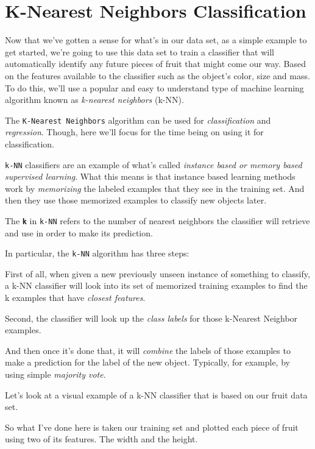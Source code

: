 \section{K-Nearest Neighbors Classification}
\begin{multicols}{2}

Now that we've gotten a sense for what's in our data set, as a simple example to get started, we're going to use this data set to train a classifier that will automatically identify any future pieces of fruit that might come our way. Based on the features available to the classifier such as the object's color, size and mass. To do this, we'll use a popular and easy to understand type of machine learning algorithm known as \emph{k-nearest neighbors} (k-NN). 

The \texttt{K-Nearest Neighbors} algorithm can be used for \emph{classification} and \emph{regression}. Though, here we'll focus for the time being on using it for classification. 

\texttt{k-NN} classifiers are an example of what's called \emph{instance based or memory based supervised learning}. What this means is that instance based learning methods work by \emph{memorizing} the labeled examples that they see in the training set. And then they use those memorized examples to classify new objects later. 

The \textbf{\texttt{k}} in \texttt{k-NN} refers to the number of nearest neighbors the classifier will retrieve and use in order to make its prediction. 

In particular, the \texttt{k-NN}  algorithm has three steps:

First of all, when given a new previously unseen instance of something to classify, a k-NN classifier will look into its set of memorized training examples to find the k examples that have \emph{closest features}. 

Second, the classifier will look up the \emph{class labels} for those k-Nearest Neighbor examples. 

And then once it's done that, it will \emph{combine} the labels of those examples to make a prediction for the label of the new object. Typically, for example, by using simple \emph{majority vote}. 

Let's look at a visual example of a k-NN classifier that is based on our fruit data set. 

So what I've done here is taken our training set and plotted each piece of fruit using two of its features. The width and the height. 


\end{multicols}
